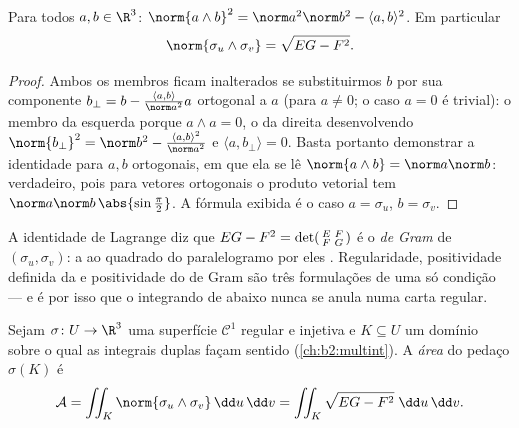 \begin{lemma}\label{lem:b2:surfaces:lagrange}
Para todos $a, b \in \R^3$:
$\norm{a \wedge b}^2 = \norm a^2 \norm b^2 - \langle a, b\rangle^2$.
Em particular
\[
\norm{\sigma_u \wedge \sigma_v} = \sqrt{EG - F^2}.
\]
\end{lemma}

\begin{proof}
Ambos os membros ficam inalterados se substituirmos $b$ por sua componente $b_\perp
= b - \frac{\langle a, b\rangle}{\norm a^2}a$ ortogonal a $a$
(para $a \neq 0$; o caso $a = 0$ é trivial): o membro da esquerda
porque $a \wedge a = 0$, o da direita desenvolvendo $\norm
{b_\perp}^2 = \norm b^2 - \frac{\langle a,b\rangle^2}{\norm a^2}$
e $\langle a, b_\perp\rangle = 0$. Basta portanto demonstrar a
identidade para $a, b$ ortogonais, em que ela se lê $\norm{a \wedge
b} = \norm a \norm b$: verdadeiro, pois para vetores ortogonais o
produto vetorial tem  $\norm a\norm b\,\abs{\sin\frac\pi2}$. A
fórmula exibida é o caso $a = \sigma_u$, $b = \sigma_v$.
\end{proof}

\begin{remark}
A identidade de Lagrange diz que $EG - F^2 = \det\begin{psmallmatrix}
E & F\\ F & G\end{psmallmatrix}$ é o \emph{
de Gram} de $(\sigma_u, \sigma_v)$: a  ao quadrado do
paralelogramo por eles . Regularidade, positividade
definida da  e positividade do
 de Gram são três formulações de uma só condição ---
e é por isso que o integrando de  abaixo nunca se anula numa
carta regular.
\end{remark}

\begin{definition}[Área]\label{def:b2:surfaces:area}
Sejam $\sigma \colon U \to \R^3$ uma superfície $\mathcal{C}^1$ regular e injetiva
e $K \subseteq U$ um domínio  sobre o qual as integrais duplas
façam sentido (\cref{ch:b2:multint}). A
\emph{área} do pedaço $\sigma(K)$ é
\[
\mathcal{A}
= \iint_K \norm{\sigma_u \wedge \sigma_v}\,\dd u\,\dd v
= \iint_K \sqrt{EG - F^2}\;\dd u\,\dd v .
\]
\end{definition}

